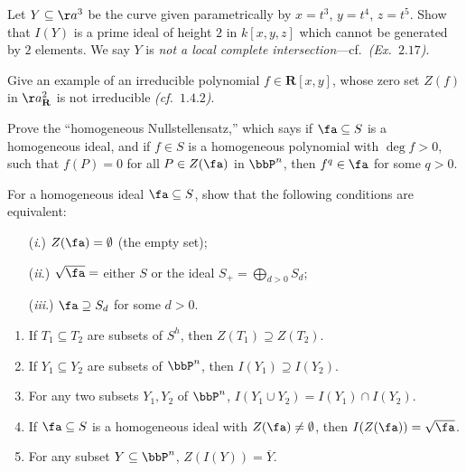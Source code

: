 \begin{exercise}[1.11]
    Let $Y \subseteq \aa^3$ be the curve given parametrically by
    $x = t^3$, $y= t^4$, $z = t^5$.
    Show that $I(Y)$ is a prime ideal of height $2$ in $k[x,y,z]$ which cannot
    be generated by $2$ elements.
    We say $Y$ is \emph{not a local complete
    intersection}---cf.~\emph{(Ex.~$2.17$)}. 
\end{exercise}

\begin{exercise}[1.12]
    Give an example of an irreducible polynomial $f \in \mathbf{R}[x,y]$,
    whose zero set $Z(f)$ in $\aa_{\mathbf{R}}^2$ is not irreducible
    \emph{(cf.~$1.4.2$)}.
\end{exercise}

\begin{exercise}[2.1]
    Prove the ``homogeneous Nullstellensatz,'' which says if $\fa
    \subseteq S$ is a homogeneous ideal, and if $f \in S$ is a homogeneous
    polynomial with $\deg f > 0$, such that $f(P) = 0$ for all $P \in
    Z(\fa)$ in $\bbP^n$, then $f^q \in \fa$ for some $q >
    0$.
\end{exercise}

\begin{exercise}[2.2]
    For a homogeneous ideal $\fa \subseteq S$, show that the following
    conditions are equivalent:
    \begin{itemize}
        \item[(\emph{i}.)] $Z(\fa) = \emptyset$ (the empty set);
        \item[(\emph{ii}.)] $\sqrt{\fa} =$ either $S$ or the ideal $S_+ =
        \bigoplus_{d > 0}S_d$;
        \item[(\emph{iii}.)] $\fa \supseteq S_d$ for some $d > 0$. 
    \end{itemize}
\end{exercise}

\begin{exercise}[2.3]
    \begin{enumerate}
        \item If $T_1 \subseteq T_2$ are subsets of $S^h$, then $Z(T_1) \supseteq
        Z(T_2)$.
      \item If $Y_1 \subseteq Y_2$ are subsets of $\bbP^n$, then $I(Y_1) \supseteq
        I(Y_2)$.
      \item For any two subsets $Y_1,Y_2$ of $\bbP^n$, $I(Y_1 \cup Y_2) = I(Y_1)
        \cap I(Y_2)$.
      \item If $\fa \subseteq S$ is a homogeneous ideal with
        $Z(\fa) \ne \emptyset$, then $I(Z(\fa)) =
        \sqrt{\fa}$.
      \item For any subset $Y \subseteq \bbP^n$, $Z(I(Y)) = \overline{Y}$.
    \end{enumerate}
\end{exercise}

